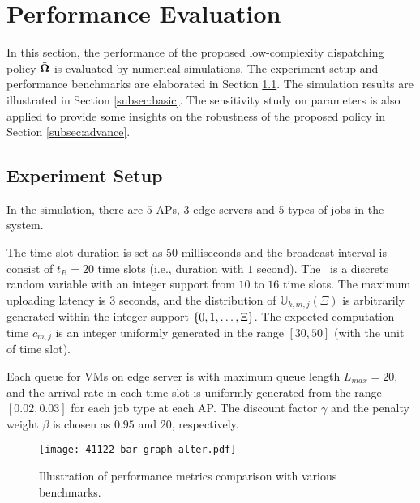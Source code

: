 \section{Performance Evaluation}
\label{sec:evaluation}
In this section, the performance of the proposed low-complexity dispatching policy $\tilde{\boldsymbol{\Omega}}$ is evaluated by numerical simulations.
The experiment setup and performance benchmarks are elaborated in Section \ref{subsec:setup}.
The simulation results are illustrated in Section \ref{subsec:basic}.
The sensitivity study on parameters is also applied to provide some insights on the robustness of the proposed policy in Section \ref{subsec:advance}.

\subsection{Experiment Setup}
\label{subsec:setup}
In the simulation, there are $5$ APs, $3$ edge servers and $5$ types of jobs in the system.

The time slot duration is set as $50$ milliseconds and the broadcast interval is consist of $t_{B}=20$ time slots (i.e., duration with $1$ second).
The \brlatency~is a discrete random variable with an integer support from $10$ to $16$ time slots.
The maximum uploading latency is $3$ seconds, and the distribution of $\mathbb{U}_{k,m,j}(\Xi)$  is arbitrarily generated within the integer support $\{0, 1, \dots, \Xi\}$.
The expected computation time $c_{m,j}$ is an integer uniformly generated in the range $[30,50]$ (with the unit of time slot).

Each queue for VMs on edge server is with maximum queue length $L_{max}=20$, and the arrival rate in each time slot is uniformly generated from the range $[0.02, 0.03]$ for each job type at each AP.
The discount factor $\gamma$ and the penalty weight $\beta$ is chosen as $0.95$ and $20$, respectively.

\begin{figure}[ht]
    \centering
    \texttt{[image: 41122-bar-graph-alter.pdf]}
    \caption{Illustration of performance metrics comparison with various benchmarks.}
    \label{fig:bar_plot}
\end{figure}

